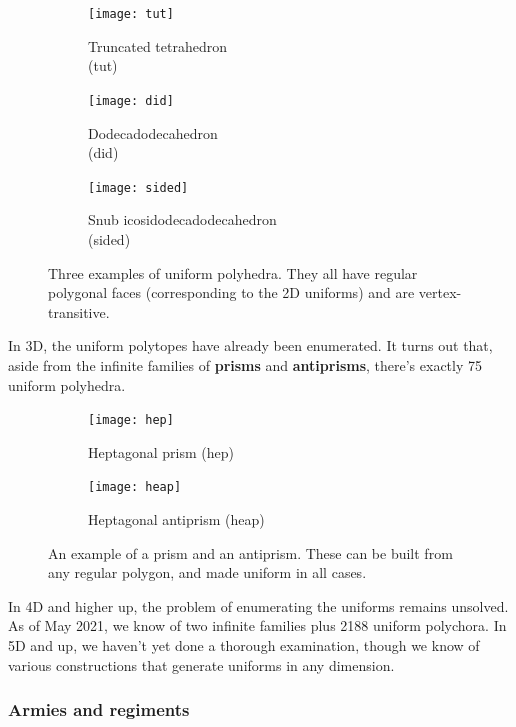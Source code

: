 \documentclass{article}
\begin{document}
\begin{figure}[H]
\centering
\begin{subfigure}{.33333\textwidth}
  \centering
  \texttt{[image: tut]}
  \caption{Truncated tetrahedron\\(tut)}
  \label{fig:tut}
\end{subfigure}%
\begin{subfigure}{.33333\textwidth}
  \centering
  \texttt{[image: did]}
  \caption{Dodecadodecahedron\\(did)}
  \label{fig:did}
\end{subfigure}%
\begin{subfigure}{.33333\textwidth}
  \centering
  \texttt{[image: sided]}
  \caption{Snub icosidodecadodecahedron\\(sided)}
  \label{fig:sided}
\end{subfigure}%
\caption{Three examples of uniform polyhedra. They all have regular polygonal faces (corresponding to the 2D uniforms) and are vertex-transitive.}
\label{fig:uniforms3D}
\end{figure}

In 3D, the uniform polytopes have already been enumerated. It turns out that, aside from the infinite families of \textbf{prisms} and \textbf{antiprisms}, there's exactly 75 uniform polyhedra. %

\begin{figure}[H]
\centering
\begin{subfigure}{.5\textwidth}
  \centering
  \texttt{[image: hep]}
  \caption{Heptagonal prism (hep)}
  \label{fig:hep}
\end{subfigure}%
\begin{subfigure}{.5\textwidth}
  \centering
  \texttt{[image: heap]}
  \caption{Heptagonal antiprism (heap)}
  \label{fig:heap}
\end{subfigure}%
\caption{An example of a prism and an antiprism. These can be built from any regular polygon, and made uniform in all cases.}
\label{fig:prisms}
\end{figure}

In 4D and higher up, the problem of enumerating the uniforms remains unsolved.
As of May 2021, we know of two infinite families plus 2188 uniform polychora.
In 5D and up, we haven't yet done a thorough examination, though we know of various
constructions that generate uniforms in any dimension.

\subsubsection{Armies and regiments}
\end{document}
